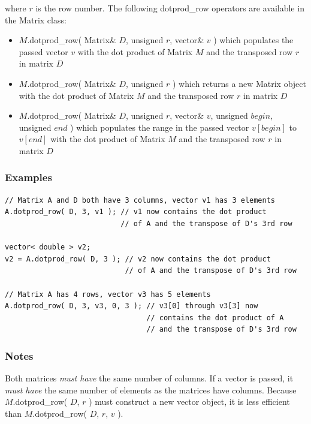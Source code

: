 \documentclass{report}
\begin{document}
where $r$ is the row number.  The following dotprod\_row operators are
available in the Matrix class:

\begin{itemize}
\item $M$.dotprod\_row( Matrix\& $D$, unsigned $r$, vector\& $v$ )
which
      populates the passed vector $v$ with the dot product of Matrix
      $M$
      and the transposed row $r$ in matrix $D$
\item $M$.dotprod\_row( Matrix\& $D$, unsigned $r$ ) which returns a
new
      Matrix object with the dot product of Matrix $M$
      and the transposed row $r$ in matrix $D$
\item $M$.dotprod\_row( Matrix\& $D$, unsigned $r$, vector\& $v$,
      unsigned $begin$, unsigned $end$ ) which populates the range in
      the passed vector $v[begin]$ to $v[end]$ with the dot product of
      Matrix $M$ and the transposed row $r$ in matrix $D$
\end{itemize}

\subsubsection{Examples}

\begin{verbatim}
// Matrix A and D both have 3 columns, vector v1 has 3 elements
A.dotprod_row( D, 3, v1 ); // v1 now contains the dot product
                           // of A and the transpose of D's 3rd row

vector< double > v2;
v2 = A.dotprod_row( D, 3 ); // v2 now contains the dot product
                            // of A and the transpose of D's 3rd row

// Matrix A has 4 rows, vector v3 has 5 elements
A.dotprod_row( D, 3, v3, 0, 3 ); // v3[0] through v3[3] now
                                 // contains the dot product of A
                                 // and the transpose of D's 3rd row
\end{verbatim}

\subsubsection{Notes}
Both matrices {\em must have} the same number of columns.  If a vector
is passed, it {\em must have} the same number of elements as the
matrices have columns.  Because $M$.dotprod\_row( $D$, $r$ ) must
construct a new vector object, it is less efficient than
$M$.dotprod\_row( $D$, $r$, $v$ ).
\end{document}
